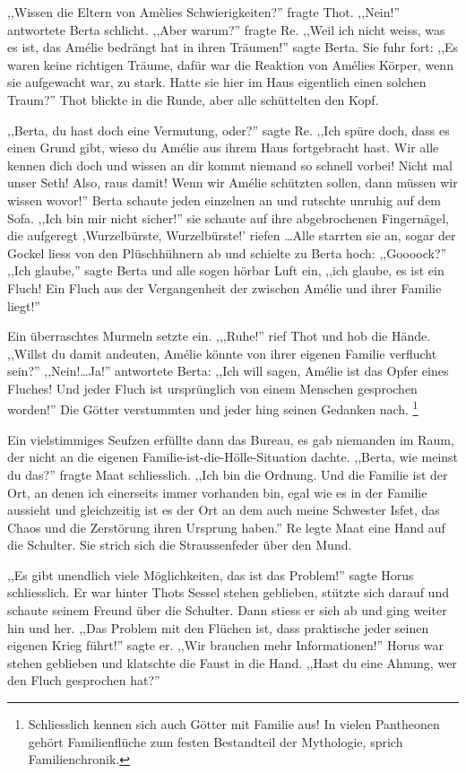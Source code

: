 \documentclass[11pt,titlepage,a5paper]{book}
\begin{document}
,,Wissen die Eltern von Amèlies Schwierigkeiten?'' fragte Thot. ,,Nein!'' antwortete Berta schlicht. ,,Aber warum?'' fragte Re. ,,Weil ich nicht weiss, was es ist, das Amélie bedrängt hat in ihren Träumen!'' sagte Berta. Sie fuhr fort: ,,Es waren keine richtigen Träume, dafür war die Reaktion von Amélies Körper, wenn sie aufgewacht war, zu stark. Hatte sie hier im Haus eigentlich einen solchen Traum?'' Thot blickte in die Runde, aber alle schüttelten den Kopf.

,,Berta, du hast doch eine Vermutung, oder?'' sagte Re. ,,Ich spüre doch, dass es einen Grund gibt, wieso du Amélie aus ihrem Haus fortgebracht hast. Wir alle kennen dich doch und wissen an dir kommt niemand so schnell vorbei! Nicht mal unser Seth! Also, raus damit! Wenn wir Amélie schützten sollen, dann müssen wir wissen wovor!'' Berta schaute jeden einzelnen an und rutschte unruhig auf dem Sofa. ,,Ich bin mir nicht sicher!'' sie schaute auf ihre abgebrochenen Fingernägel, die aufgeregt ,Wurzelbürste, Wurzelbürste!' riefen \dots Alle starrten sie an, sogar der Gockel liess von den Plüschhühnern ab und schielte zu Berta hoch: ,,Goooock?'' ,,Ich glaube,'' sagte Berta und alle sogen hörbar Luft ein, ,,ich glaube, es ist ein Fluch! Ein Fluch aus der Vergangenheit der zwischen Amélie und ihrer Familie liegt!'' 

Ein überraschtes Murmeln setzte ein. ,,,Ruhe!'' rief Thot und hob die Hände. ,,Willst du damit andeuten, Amélie könnte von ihrer eigenen Familie verflucht sein?'' ,,Nein!\dots Ja!'' antwortete Berta: ,,Ich will sagen, Amélie ist das Opfer eines Fluches! Und jeder Fluch ist ursprünglich von einem Menschen gesprochen worden!'' Die Götter verstummten und jeder hing seinen Gedanken nach. \footnote{Schliesslich kennen sich auch Götter mit Familie aus! In vielen Pantheonen gehört Familienflüche zum festen Bestandteil der Mythologie, sprich Familienchronik.} 

Ein vielstimmiges Seufzen erfüllte dann das Bureau, es gab niemanden im Raum, der nicht an die eigenen Familie-ist-die-Hölle-Situation dachte. ,,Berta, wie meinst du das?'' fragte Maat schliesslich. ,,Ich bin die Ordnung. Und die Familie ist der Ort, an denen ich einerseits immer vorhanden bin, egal wie es in der Familie aussieht und gleichzeitig ist es der Ort an dem auch meine Schwester Isfet, das Chaos und die Zerstörung ihren Ursprung haben.'' Re legte Maat eine Hand auf die Schulter. Sie strich sich die Straussenfeder über den Mund.

,,Es gibt unendlich viele Möglichkeiten, das ist das Problem!'' sagte Horus schliesslich. Er war hinter Thots Sessel stehen geblieben, stützte sich darauf und schaute seinem Freund über die Schulter. Dann stiess er sich ab und ging weiter hin und her. ,,Das Problem mit den Flüchen ist, dass praktische jeder seinen eigenen Krieg führt!'' sagte er. ,,Wir brauchen mehr Informationen!'' Horus war stehen geblieben und klatschte die Faust in die Hand. ,,Hast du eine Ahnung, wer den Fluch gesprochen hat?''
\end{document}
